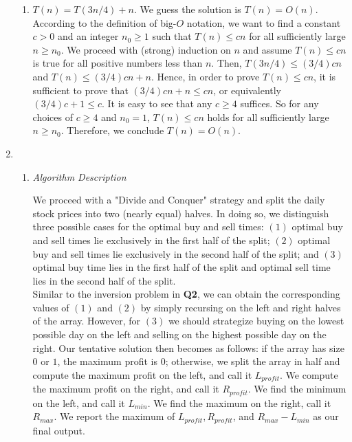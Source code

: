 \documentclass[10pt, letterpaper]{article}
\begin{document}
\begin{enumerate}[label={\bfseries Q\arabic*.}]
\begin{enumerate}
      \item
        $T(n) = T(3n/4) + n$. We guess the solution is $T(n) = O(n)$. According to the definition of big-$O$
        notation, we want to find a constant $c > 0$ and an integer $n_0 \geq 1$ such that $T(n) \leq cn$ for all
        sufficiently large $n \geq n_0$. We proceed with (strong) induction on $n$ and assume $T(n) \leq cn$ is true for all
        positive numbers less than $n$. Then, $T(3n/4) \leq (3/4)cn$ and $T(n) \leq (3/4)cn + n$. Hence, in order
        to prove $T(n) \leq cn$, it is sufficient to prove that $(3/4)cn + n \leq cn$, or equivalently $(3/4)c + 1
        \leq c$. It is easy to see that any $c \geq 4$ suffices. So for any choices of $c \geq 4$ and $n_0 = 1$,
        $T(n) \leq cn$ holds for all sufficiently large $n \geq n_0$. Therefore, we conclude $T(n) = O(n)$.
    \end{enumerate}

  \item
    \begin{enumerate}
      \item
        {\itshape Algorithm Description} \\ \vspace{-3mm}

        We proceed with a "Divide and Conquer" strategy and split the daily stock prices into two (nearly equal)
        halves. In doing so, we distinguish three possible cases for the optimal buy and sell times: $(1)$ optimal
        buy and sell times lie exclusively in the first half of the split; $(2)$ optimal buy and sell times lie
        exclusively in the second half of the split; and $(3)$ optimal buy time lies in the first half of the split
        and optimal sell time lies in the second half of the split. \\

        Similar to the inversion problem in \textbf{Q2}, we can obtain the corresponding values of $(1)$ and $(2)$
        by simply recursing on the left and right halves of the array. However, for $(3)$ we should strategize buying
        on the lowest possible day on the left and selling on the highest possible day on the right. Our tentative
        solution then becomes as follows: if the array has size $0$ or $1$, the maximum profit is $0$; otherwise, we
        split the array in half and compute the maximum profit on the left, and call it $L_{profit}$. We compute the
        maximum profit on the right, and call it $R_{profit}$. We find the minimum on the left, and call it $L_{min}$.
        We find the maximum on the right, call it $R_{max}$. We report the maximum of $L_{profit}, R_{profit}$, and
        $R_{max} - L_{min}$ as our final output. \\


\end{enumerate}
\end{enumerate}
\end{document}
